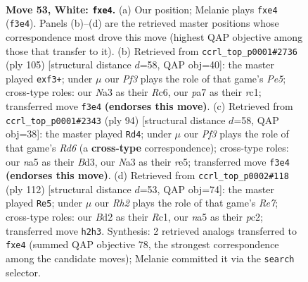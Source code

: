 \documentclass[11pt]{article}
\begin{document}
\clearpage

\begin{figure}[p]\centering
\begin{subfigure}{0.46\textwidth}\centering
\resizebox{\linewidth}{!}{%
\newchessgame
\chessboard[
  setfen={6r1/p7/1pr1p1kp/n7/2P1p3/N4P2/P2BK1PR/2R5 w - - 2 53},
  showmover=false,
  pgfstyle=straightmove, color=movearrow, markmove={f3-e4}
]}
\caption{}
\end{subfigure}\hfill
\begin{subfigure}{0.46\textwidth}\centering
\resizebox{\linewidth}{!}{%
\newchessgame
\chessboard[
  setfen={8/3r2k1/2r3p1/4b2p/4pN1P/2p1PPP1/2R3K1/2R5 b - - 0 53},
  showmover=false,
  pgfstyle=straightmove, color=movearrow, markmove={e4-f3}
]}
\caption{}
\end{subfigure}
\\[4pt]
\begin{subfigure}{0.46\textwidth}\centering
\resizebox{\linewidth}{!}{%
\newchessgame
\chessboard[
  setfen={8/2r2nk1/3R2p1/p3rp1p/7P/1P1B2P1/2P5/2K2R2 w - - 1 48},
  showmover=false,
  pgfstyle=straightmove, color=movearrow, markmove={d6-d4}
]}
\caption{}
\end{subfigure}\hfill
\begin{subfigure}{0.46\textwidth}\centering
\resizebox{\linewidth}{!}{%
\newchessgame
\chessboard[
  setfen={1rr3k1/4R1p1/7p/1P5P/5p2/1N2P3/p1p2PP1/2R2K2 w - - 2 57},
  showmover=false,
  pgfstyle=straightmove, color=movearrow, markmove={e7-e5}
]}
\caption{}
\end{subfigure}
\caption{\textbf{Move 53, White: \texttt{fxe4}.} (a) Our position; Melanie plays \texttt{fxe4} (\texttt{f3e4}). Panels (b)--(d) are the retrieved master positions whose correspondence most drove this move (highest QAP objective among those that transfer to it). (b) Retrieved from \texttt{ccrl\_top\_p0001\#2736} (ply 105) [structural distance $d$=58, QAP obj=40]: the master played \texttt{exf3+}; under $\mu$ our \emph{Pf3} plays the role of that game's \emph{Pe5}; cross-type roles: our \emph{N}a3 as their \emph{R}c6, our \emph{p}a7 as their \emph{r}c1; transferred move \texttt{f3e4} \textbf{(endorses this move)}. (c) Retrieved from \texttt{ccrl\_top\_p0001\#2343} (ply 94) [structural distance $d$=58, QAP obj=38]: the master played \texttt{Rd4}; under $\mu$ our \emph{Pf3} plays the role of that game's \emph{Rd6} (a \textbf{cross-type} correspondence); cross-type roles: our \emph{n}a5 as their \emph{B}d3, our \emph{N}a3 as their \emph{r}e5; transferred move \texttt{f3e4} \textbf{(endorses this move)}. (d) Retrieved from \texttt{ccrl\_top\_p0002\#118} (ply 112) [structural distance $d$=53, QAP obj=74]: the master played \texttt{Re5}; under $\mu$ our \emph{Rh2} plays the role of that game's \emph{Re7}; cross-type roles: our \emph{B}d2 as their \emph{R}c1, our \emph{n}a5 as their \emph{p}c2; transferred move \texttt{h2h3}. Synthesis: 2 retrieved analogs transferred to \texttt{fxe4} (summed QAP objective 78, the strongest correspondence among the candidate moves); Melanie committed it via the \texttt{search} selector.}
\label{fig:thought-m104}
\end{figure}
\end{document}
